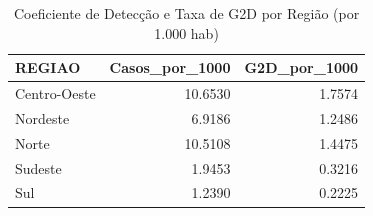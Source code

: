\begin{table}
\caption{Coeficiente de Detecção e Taxa de G2D por Região (por 1.000 hab)}
\label{tab:regional_normalizado}
\begin{tabular}{lrr}
\toprule
REGIAO & Casos_por_1000 & G2D_por_1000 \\
\midrule
Centro-Oeste & 10.6530 & 1.7574 \\
Nordeste & 6.9186 & 1.2486 \\
Norte & 10.5108 & 1.4475 \\
Sudeste & 1.9453 & 0.3216 \\
Sul & 1.2390 & 0.2225 \\
\bottomrule
\end{tabular}
\end{table}
